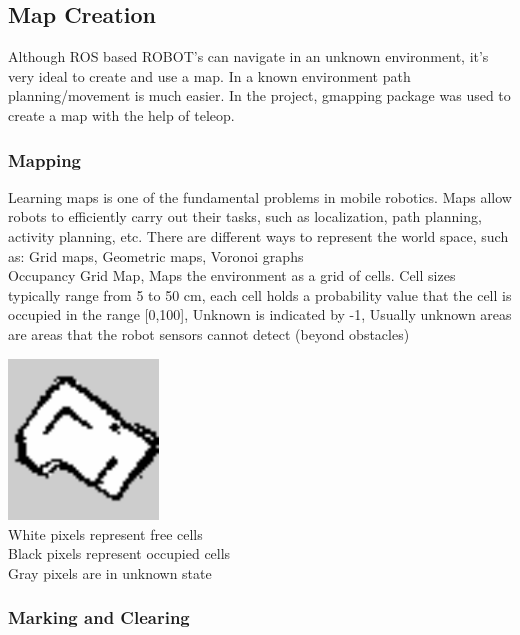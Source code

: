 \documentclass[10pt,a4paper]{article}
\begin{document}
\subsection{Map Creation}

Although ROS based ROBOT’s can navigate in an unknown environment, it’s very ideal to create and use a map. In a known environment path planning/movement is much easier.  In the project, gmapping package was used to create a map with the help of teleop. \\

\subsubsection{Mapping}
	
Learning maps is one of the fundamental problems in mobile robotics. Maps allow robots to efficiently carry out their tasks, such as localization, path planning, activity planning, etc. There are different ways to represent the world space, such as: Grid maps, Geometric maps, Voronoi graphs \\

Occupancy Grid Map, Maps the environment as a grid of cells. Cell sizes typically range from 5 to 50 cm, each cell holds a probability value that the cell is occupied in the range [0,100], Unknown is indicated by -1, Usually unknown areas are areas that the robot sensors cannot detect (beyond obstacles)

\begin{center}
\includegraphics[width=0.3\textwidth]{images/arena1.png}\\
White pixels represent free cells \\
Black pixels represent occupied cells \\
Gray pixels are in unknown state \\
\end{center}

\subsubsection{Marking and Clearing}
\end{document}
